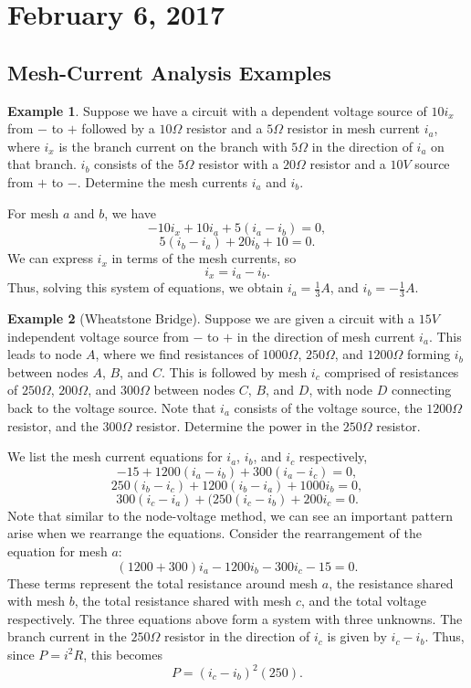 \documentclass[11pt]{article}
\theoremstyle{plain} %
\theoremstyle{definition}
\theoremstyle{example}
\newtheorem*{example}{Example}
\theoremstyle{remark}
\begin{document}
\section{February 6, 2017}
\subsection{Mesh-Current Analysis Examples}

\begin{example}
Suppose we have a circuit with a dependent voltage source of $10i_x$ from $-$ to $+$ followed by a $10\Omega$ resistor and a $5\Omega$ resistor in mesh current $i_a$, where $i_x$ is the branch current on the branch with $5\Omega$ in the direction of $i_a$ on that branch. $i_b$ consists of the $5\Omega$ resistor with a $20\Omega$ resistor and a $10V$ source from $+$ to $-$. Determine the mesh currents $i_a$ and $i_b$.
\end{example}

For mesh $a$ and $b$, we have 
$$-10i_x + 10i_a + 5(i_a-i_b) = 0,$$
$$5(i_b-i_a) + 20i_b+10=0.$$
We can express $i_x$ in terms of the mesh currents, so $$i_x = i_a-i_b.$$ 
Thus, solving this system of equations, we obtain $i_a= \frac{1}{3}{A}$, and $i_b = -\frac{1}{3}A$.

\begin{example}[Wheatstone Bridge]
Suppose we are given a circuit with a $15V$ independent voltage source from $-$ to $+$ in the direction of mesh current $i_a$. This leads to node $A$, where we find resistances of $1000\Omega$, $250\Omega$, and $1200\Omega$ forming $i_b$ between nodes $A$, $B$, and $C$. This is followed by mesh $i_c$ comprised of resistances of $250\Omega$, $200\Omega$, and $300\Omega$ between nodes $C$, $B$, and $D$, with node $D$ connecting back to the voltage source. Note that $i_a$ consists of the voltage source, the $1200\Omega$ resistor, and the $300\Omega$ resistor. Determine the power in the $250\Omega$ resistor.
\end{example}

We list the mesh current equations for $i_a$, $i_b$, and $i_c$ respectively,
$$-15+1200(i_a-i_b) + 300(i_a-i_c)=0,$$
$$250(i_b-i_c) + 1200(i_b-i_a) + 1000i_b=0,$$
$$300(i_c-i_a) + (250(i_c-i_b) + 200i_c = 0.$$
Note that similar to the node-voltage method, we can see an important pattern arise when we rearrange the equations. Consider the rearrangement of the equation for mesh $a$:
$$(1200+300)i_a - 1200i_b - 300i_c -15 = 0.$$
These terms represent the total resistance around mesh $a$, the resistance shared with mesh $b$, the total resistance shared with mesh $c$, and the total voltage respectively. The three equations above form a system with three unknowns. The branch current in the $250\Omega$ resistor in the direction of $i_c$ is given by $i_c-i_b$. Thus, since $P = i^2R$, this becomes
$$P = (i_c-i_b)^2(250).$$
\end{document}
